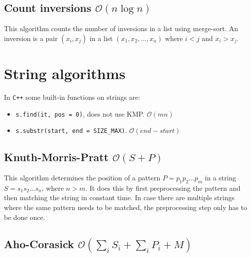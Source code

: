 \subsection{Count inversions $\mathcal O(n\log n)$}

This algorithm counts the number of inversions in a list using merge-sort. An inversion is a pair $(x_i, x_j)$ in a list $(x_1, x_2, \dots, x_n)$ where $i < j$ and $x_i > x_j$.





\section{String algorithms}

In \texttt{C++} some built-in functions on strings are:
\begin{itemize}
    \item \texttt{s.find(it, pos = 0)}, does not use KMP. $\mathcal O(mn)$
    \item \texttt{s.substr(start, end = SIZE\_MAX)}. $\mathcal O(end - start)$
\end{itemize}

\subsection{Knuth-Morris-Pratt $\mathcal O(S + P)$}

This algorithm determines the position of a pattern $P = p_1p_2\dots p_m$ in a string $S = s_1s_2\dots s_n$, where $n > m$. It does this by first preprocessing the pattern and then matching the string in constant time. In case there are multiple strings where the same pattern needs to be matched, the preprocessing step only has to be done once.



\subsection{Aho-Corasick $\mathcal O(\sum_i S_i + \sum_i P_i + M)$}

